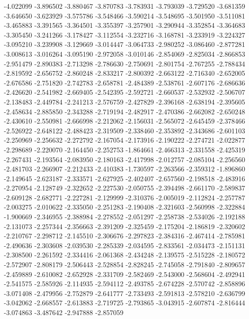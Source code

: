 -4.022099
-3.896502
-3.880467
-3.870783
-3.783931
-3.793039
-3.729520
-3.681359
-3.646650
-3.623929
-3.575786
-3.548466
-3.590214
-3.548695
-3.501950
-3.511081
-3.465883
-3.391565
-3.364501
-3.355397
-3.257901
-3.290944
-3.352854
-3.364683
-3.305450
-3.241266
-3.178427
-3.112554
-3.232716
-3.168781
-3.233919
-3.224327
-3.095210
-3.239908
-3.129669
-3.014447
-3.064733
-2.980252
-3.086460
-2.877281
-3.008613
-3.016264
-3.095190
-2.972058
-3.010146
-2.854069
-2.825034
-2.866853
-2.951479
-2.890383
-2.713298
-2.786630
-2.750691
-2.801754
-2.767255
-2.788434
-2.819592
-2.656752
-2.860248
-2.833217
-2.800392
-2.663122
-2.716340
-2.652005
-2.676586
-2.751820
-2.742783
-2.658781
-2.484389
-2.538761
-2.607176
-2.686636
-2.426620
-2.541982
-2.669405
-2.542395
-2.592721
-2.660537
-2.532932
-2.506707
-2.138483
-2.449784
-2.241213
-2.576759
-2.427829
-2.396168
-2.638194
-2.395605
-2.458634
-2.885850
-2.343288
-2.719194
-2.482917
-2.470386
-2.662082
-2.650248
-2.430610
-2.550981
-2.666998
-2.212062
-2.156031
-2.565072
-2.645459
-2.378466
-2.526922
-2.648122
-2.488423
-2.319509
-2.338460
-2.353892
-2.343686
-2.601103
-2.250969
-2.256632
-2.272792
-2.167054
-2.173916
-2.190222
-2.274721
-2.022877
-2.298689
-2.220070
-2.164450
-2.252753
-1.864661
-2.466313
-2.331558
-2.425319
-2.267431
-2.193564
-2.083950
-2.180163
-2.417998
-2.012757
-2.085104
-2.256560
-2.481703
-2.266907
-2.212433
-2.410383
-1.730597
-2.263566
-2.359312
-1.896860
-2.149645
-2.623187
-2.333571
-2.627925
-2.402407
-2.657560
-2.198518
-2.483916
-2.270954
-2.128749
-2.322652
-2.227530
-2.050755
-2.394498
-2.661170
-2.589837
-2.609128
-2.682771
-2.227281
-2.129999
-2.310376
-2.005019
-2.112824
-2.257787
-2.003275
-2.010622
-2.335050
-2.251283
-2.190408
-2.321603
-2.560998
-2.322884
-1.900669
-2.346955
-2.388984
-2.278552
-2.051297
-2.258738
-2.534026
-2.192188
-2.131073
-2.257344
-2.356663
-2.391209
-2.325459
-2.175204
-2.186819
-2.320602
-2.210767
-2.298712
-2.145510
-2.306676
-2.297823
-2.384316
-2.467414
-2.785981
-2.490636
-2.303608
-2.039530
-2.285339
-2.034595
-2.833561
-2.034473
-2.151131
-2.308500
-2.261592
-2.334416
-2.061368
-2.434248
-2.139575
-2.515228
-2.180572
-2.572907
-2.808179
-2.506443
-2.528854
-2.828245
-2.745058
-2.791840
-2.809657
-2.459889
-2.610082
-2.652928
-2.331709
-2.582469
-2.543000
-2.568604
-2.492941
-2.541575
-2.585926
-2.114935
-2.594112
-2.493785
-2.674228
-2.570742
-2.858896
-3.071408
-2.479956
-2.752879
-2.641777
-2.733493
-2.591813
-2.578210
-2.636799
-3.042062
-2.668557
-2.613883
-2.719725
-2.793865
-3.043915
-2.607874
-2.816444
-3.074863
-3.487642
-2.947888
-2.857059

